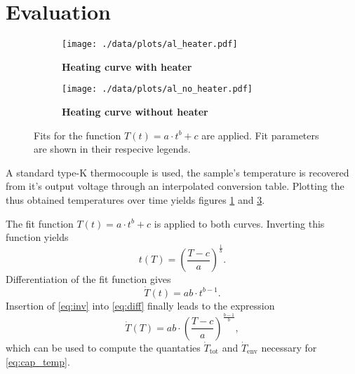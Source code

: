 \section{Evaluation}
\begin{figure}[tbp]
	\centering
	\begin{subfigure}{.45\textwidth}
		\centering
		\texttt{[image: ./data/plots/al\_heater.pdf]}
		\caption[Heating curve with heater]{\textbf{Heating curve with heater}}
		\label{fig:heater}
	\end{subfigure}
	\quad
	\begin{subfigure}{.45\textwidth}
		\centering
		\texttt{[image: ./data/plots/al\_no\_heater.pdf]}
		\caption[Heating curve without heater]{\textbf{Heating curve without heater}}
		\label{fig:no_heater}
	\end{subfigure}
	\caption[Heating curves for aluminium]{Fits for the function $T(t)=a\cdot t^b + c$ are applied. Fit parameters are shown in their respecive legends.}
\end{figure}

A standard type-K thermocouple is used, the sample's temperature is recovered from it's output voltage through an interpolated conversion table.
Plotting the thus obtained temperatures over time yields figures \ref{fig:heater} and \ref{fig:no_heater}.	

The fit function $T(t)=a\cdot t^b + c$ is applied to both curves.	%
Inverting this function yields
\begin{equation}\label{eq:inv}
	t(T) = \left(\frac{T-c}{a}\right)^\frac{1}{b}.
\end{equation}
Differentiation of the fit function gives
\begin{equation}\label{eq:diff}
	\dot{T}(t) = ab\cdot t^{b-1}.
\end{equation}
Insertion of \autoref{eq:inv} into \autoref{eq:diff} finally leads to the expression
\begin{equation}\label{eq:T_dot_of_T}
	\dot{T}(T) = ab\cdot\left(\frac{T-c}{a}\right)^{\frac{b-1}{b}},
\end{equation}
which can be used to compute the quantaties $\dot{T}_\text{tot}$ and $\dot{T}_\text{env}$ necessary for \autoref{eq:cap_temp}.

